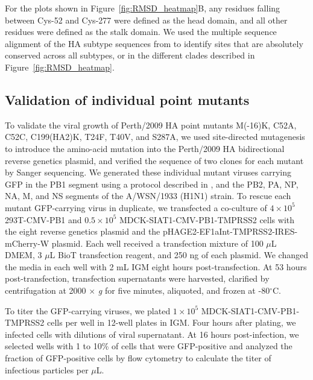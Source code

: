 \documentclass[9pt,twocolumn,twoside]{pnas-new}
\begin{document}
{For the plots shown in Figure~\ref{fig:RMSD_heatmap}B, any residues falling between Cys-52 and Cys-277 were defined as the head domain, and all other residues were defined as the stalk domain.
We used the multiple sequence alignment of the HA subtype sequences from \cite{doud2018quantifying} to identify sites that are absolutely conserved across all subtypes, or in the different clades described in Figure~\ref{fig:RMSD_heatmap}.

\subsection*{Validation of individual point mutants}
To validate the viral growth of Perth/2009 HA point mutants M(-16)K, C52A, C52C, C199(HA2)K, T24F, T40V, and S287A, we used site-directed mutagenesis to introduce the amino-acid mutation into the Perth/2009 HA bidirectional reverse genetics plasmid, and verified the sequence of two clones for each mutant by Sanger sequencing.
We generated these individual mutant viruses carrying GFP in the PB1 segment using a protocol described in \cite{bloom2010permissive,hooper2013mutant}, and the PB2, PA, NP, NA, M, and NS segments of the A/WSN/1933 (H1N1) strain.
To rescue each mutant GFP-carrying virus in duplicate, we transfected a co-culture of $4 \times 10^5$ 293T-CMV-PB1 and $0.5 \times 10^5$ MDCK-SIAT1-CMV-PB1-TMPRSS2 cells with the eight reverse genetics plasmid and the pHAGE2-EF1aInt-TMPRSS2-IRES-mCherry-W plasmid.
Each well received a transfection mixture of 100 $\mu$L DMEM, 3 $\mu$L BioT transfection reagent, and 250 ng of each plasmid.
We changed the media in each well with 2 mL IGM eight hours post-transfection.
At 53 hours post-transfection, transfection supernatants were harvested, clarified by centrifugation at 2000 $\times$ \textit{g} for five minutes, aliquoted, and frozen at -80$^\circ$C.

To titer the GFP-carrying viruses, we plated $1 \times 10^5$ MDCK-SIAT1-CMV-PB1-TMPRSS2 cells per well in 12-well plates in IGM.
Four hours after plating, we infected cells with dilutions of viral supernatant.
At 16 hours post-infection, we selected wells with 1 to 10\% of cells that were GFP-positive and analyzed the fraction of GFP-positive cells by flow cytometry to calculate the titer of infectious particles per $\mu$L.

}

\showmatmethods{} %
\end{document}
